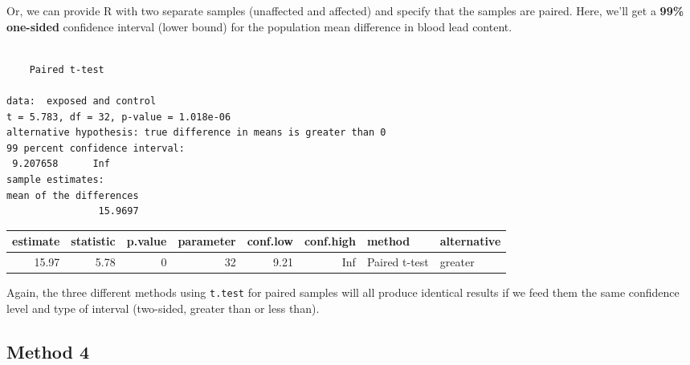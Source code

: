 \documentclass[
]{book}
\newenvironment{Shaded}{\begin{snugshade}}{\end{snugshade}}
\newcommand{\DataTypeTok}[1]{\textcolor[rgb]{0.13,0.29,0.53}{#1}}
\newcommand{\DecValTok}[1]{\textcolor[rgb]{0.00,0.00,0.81}{#1}}
\newcommand{\FloatTok}[1]{\textcolor[rgb]{0.00,0.00,0.81}{#1}}
\newcommand{\KeywordTok}[1]{\textcolor[rgb]{0.13,0.29,0.53}{\textbf{#1}}}
\newcommand{\NormalTok}[1]{#1}
\newcommand{\OperatorTok}[1]{\textcolor[rgb]{0.81,0.36,0.00}{\textbf{#1}}}
\newcommand{\OtherTok}[1]{\textcolor[rgb]{0.56,0.35,0.01}{#1}}
\newcommand{\StringTok}[1]{\textcolor[rgb]{0.31,0.60,0.02}{#1}}
\begin{document}
Or, we can provide R with two separate samples (unaffected and affected) and specify that the samples are paired. Here, we'll get a \textbf{99\%} \textbf{one-sided} confidence interval (lower bound) for the population mean difference in blood lead content.

\begin{Shaded}
\end{Shaded}

\begin{verbatim}

	Paired t-test

data:  exposed and control
t = 5.783, df = 32, p-value = 1.018e-06
alternative hypothesis: true difference in means is greater than 0
99 percent confidence interval:
 9.207658      Inf
sample estimates:
mean of the differences 
                15.9697 
\end{verbatim}

\begin{Shaded}
\end{Shaded}

\begin{tabular}{r|r|r|r|r|r|l|l}
\hline
estimate & statistic & p.value & parameter & conf.low & conf.high & method & alternative\\
\hline
15.97 & 5.78 & 0 & 32 & 9.21 & Inf & Paired t-test & greater\\
\hline
\end{tabular}

Again, the three different methods using \texttt{t.test} for paired samples will all produce identical results if we feed them the same confidence level and type of interval (two-sided, greater than or less than).

\hypertarget{method-4}{%
\subsection{Method 4}\label{method-4}}
\end{document}
